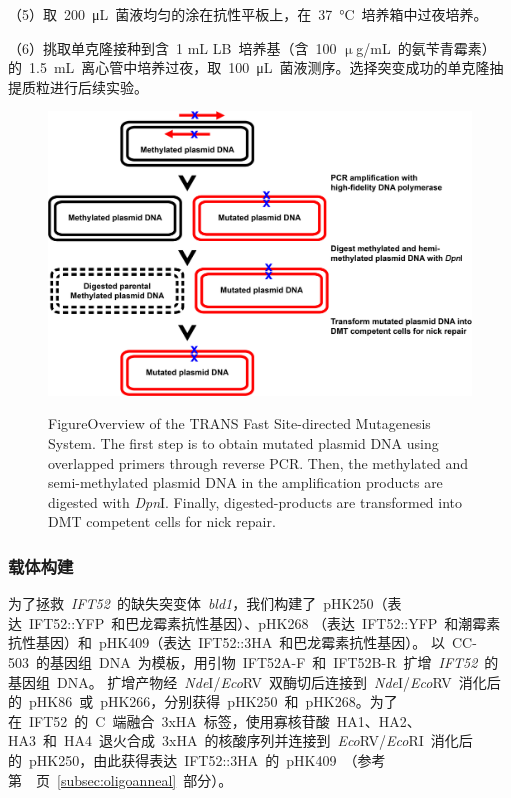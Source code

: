 （5）取\ \SI{200}{\uL}\ 菌液均匀的涂在抗性平板上，在\ \SI{37}{\degreeCelsius}\ 培养箱中过夜培养。

（6）挑取单克隆接种到含\ 1 mL LB\ 培养基（含\ 100 $\upmu$g/mL\ 的氨苄青霉素）的\ \SI{1.5}{\mL}\ 离心管中培养过夜，取\ \SI{100}{\uL}\ 菌液测序。选择突变成功的单克隆抽提质粒进行后续实验。

\begin{figure}[!ht]
\centering
\graphicspath{{figures/}}
\includegraphics[width=\textwidth]{fig5-2.jpg}
{
 {Figure}{Overview of the TRANS Fast Site-directed Mutagenesis System. The first step is to obtain mutated plasmid DNA using overlapped primers through reverse PCR. Then, the methylated and semi-methylated plasmid DNA in the amplification products are digested with \textit{Dpn}I. Finally, digested-products are transformed into DMT competent cells for nick repair.}
\par}
\end{figure}

\subsubsection{载体构建}
为了拯救\ \textit{IFT52}\ 的缺失突变体\ \textit{bld1}，我们构建了\ pHK250（表达\ IFT52::YFP\ 和巴龙霉素抗性基因）、pHK268 （表达\ IFT52::YFP\ 和潮霉素抗性基因）和\ pHK409（表达\ IFT52::3HA\ 和巴龙霉素抗性基因）。
以\ CC-503\ 的基因组\ DNA\ 为模板，用引物\ IFT52A-F\ 和\ IFT52B-R\ 扩增\ \textit{IFT52}\ 的基因组\ DNA。 扩增产物经\
\textit{Nde}I/\textit{Eco}RV\ 双酶切后连接到\ \textit{Nde}I/\textit{Eco}RV\ 消化后的\ pHK86\ 或\ pHK266，分别获得\ pHK250\ 和\ pHK268。为了在\ IFT52\ 的\ C\ 端融合\ 3xHA\ 标签，使用寡核苷酸\ HA1、HA2、HA3\ 和\ HA4\ 退火合成\ 3xHA\ 的核酸序列并连接到\ \textit{Eco}RV/\textit{Eco}RI\ 消化后的\ pHK250，由此获得表达\ IFT52::3HA\ 的\ pHK409\
（参考第\ \pageref{subsec:oligoanneal}\ 页\ \ref{subsec:oligoanneal}\ 部分）。

